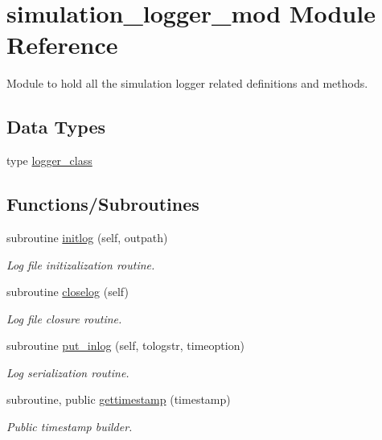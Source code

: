 \hypertarget{namespacesimulation__logger__mod}{}\section{simulation\+\_\+logger\+\_\+mod Module Reference}
\label{namespacesimulation__logger__mod}


Module to hold all the simulation logger related definitions and methods.  


\subsection*{Data Types}
\begin{DoxyCompactItemize}
\item 
type \hyperlink{structsimulation__logger__mod_1_1logger__class}{logger\+\_\+class}
\end{DoxyCompactItemize}
\subsection*{Functions/\+Subroutines}
\begin{DoxyCompactItemize}
\item 
subroutine \hyperlink{namespacesimulation__logger__mod_abf603e657da9104a8060ab53c72f0aca}{initlog} (self, outpath)
\begin{DoxyCompactList}\small\item\em Log file initizalization routine. \end{DoxyCompactList}\item 
subroutine \hyperlink{namespacesimulation__logger__mod_aa6d1aaea74403186da0f98afb74ecebe}{closelog} (self)
\begin{DoxyCompactList}\small\item\em Log file closure routine. \end{DoxyCompactList}\item 
subroutine \hyperlink{namespacesimulation__logger__mod_a34980631cfcf2d2172aa3b491acace4c}{put\+\_\+inlog} (self, tologstr, timeoption)
\begin{DoxyCompactList}\small\item\em Log serialization routine. \end{DoxyCompactList}\item 
subroutine, public \hyperlink{namespacesimulation__logger__mod_a0326a5eeb649b041064a01d96aef0989}{gettimestamp} (timestamp)
\begin{DoxyCompactList}\small\item\em Public timestamp builder. \end{DoxyCompactList}\end{DoxyCompactItemize}
